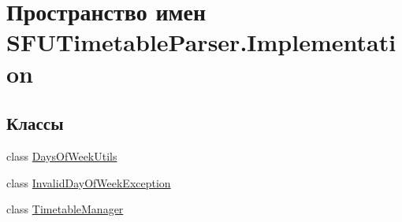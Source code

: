 \hypertarget{namespace_s_f_u_timetable_parser_1_1_implementation}{}\section{Пространство имен S\+F\+U\+Timetable\+Parser.\+Implementation}
\label{namespace_s_f_u_timetable_parser_1_1_implementation}
\subsection*{Классы}
\begin{DoxyCompactItemize}
\item 
class \hyperlink{class_s_f_u_timetable_parser_1_1_implementation_1_1_days_of_week_utils}{Days\+Of\+Week\+Utils}
\item 
class \hyperlink{class_s_f_u_timetable_parser_1_1_implementation_1_1_invalid_day_of_week_exception}{Invalid\+Day\+Of\+Week\+Exception}
\item 
class \hyperlink{class_s_f_u_timetable_parser_1_1_implementation_1_1_timetable_manager}{Timetable\+Manager}
\end{DoxyCompactItemize}
